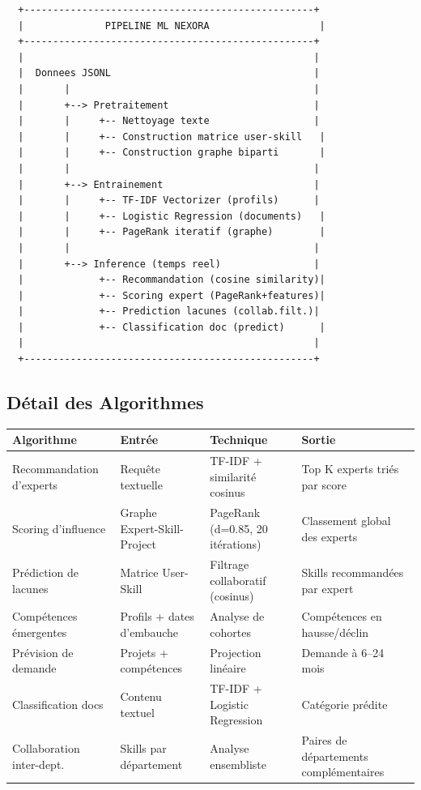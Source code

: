 \documentclass[12pt,a4paper]{article}
\begin{document}
\begin{verbatim}
  +--------------------------------------------------+
  |              PIPELINE ML NEXORA                   |
  +--------------------------------------------------+
  |                                                  |
  |  Donnees JSONL                                   |
  |       |                                          |
  |       +--> Pretraitement                         |
  |       |     +-- Nettoyage texte                  |
  |       |     +-- Construction matrice user-skill   |
  |       |     +-- Construction graphe biparti       |
  |       |                                          |
  |       +--> Entrainement                          |
  |       |     +-- TF-IDF Vectorizer (profils)      |
  |       |     +-- Logistic Regression (documents)   |
  |       |     +-- PageRank iteratif (graphe)        |
  |       |                                          |
  |       +--> Inference (temps reel)                |
  |             +-- Recommandation (cosine similarity)|
  |             +-- Scoring expert (PageRank+features)|
  |             +-- Prediction lacunes (collab.filt.)|
  |             +-- Classification doc (predict)      |
  |                                                  |
  +--------------------------------------------------+
\end{verbatim}

\subsection{Détail des Algorithmes}

\begin{longtable}{|p{3cm}|p{3cm}|p{3cm}|p{4.5cm}|}
\hline
\rowcolor{bleu!15}
\textbf{Algorithme} & \textbf{Entrée} & \textbf{Technique} & \textbf{Sortie} \\
\hline
Recommandation d'experts & Requête textuelle & TF-IDF + similarité cosinus & Top K experts triés par score \\
\hline
Scoring d'influence & Graphe Expert-Skill-Project & PageRank (d=0.85, 20 itérations) & Classement global des experts \\
\hline
Prédiction de lacunes & Matrice User-Skill & Filtrage collaboratif (cosinus) & Skills recommandées par expert \\
\hline
Compétences émergentes & Profils + dates d'embauche & Analyse de cohortes & Compétences en hausse/déclin \\
\hline
Prévision de demande & Projets + compétences & Projection linéaire & Demande à 6--24 mois \\
\hline
Classification docs & Contenu textuel & TF-IDF + Logistic Regression & Catégorie prédite \\
\hline
Collaboration inter-dept. & Skills par département & Analyse ensembliste & Paires de départements complémentaires \\
\hline
\end{longtable}
\end{document}
